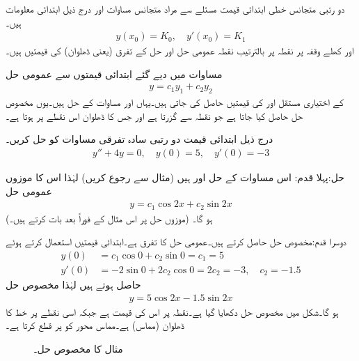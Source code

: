 دو رتبی متجانس خطی ابتدائی قیمت مسئلے سے مراد متجانس مساوات  اور درج ذیل ابتدائی معلومات ہیں۔
\begin{align}\label{مساوات_سادہ_دو_درجی_ابتدائی_قیمتیں}
y(x_0)=K_0,\quad y'(x_0)=K_1
\end{align}
 اور   کھلے وقفہ پر نقطہ  پر بالترتیب نقطہ عمومی حل اور حل کے تفرق (یعنی ڈھلوان) کی قیمتیں ہیں۔ 

مساوات  میں دیے گئے ابتدائی قیمتوں سے عمومی حل
\begin{align}
y=c_1y_1+c_2y_2
\end{align}
کے اختیاری مستقل  اور  کی قیمتیں حاصل کی جاتی ہیں۔یہاں  اور  مساوات  کے حل ہیں۔یوں مخصوص حل حاصل کیا جاتا ہے جو نقطہ  سے گزرتا ہے اور جس کا ڈھلوان اس نقطے پر  ہوتا ہے۔

درج ذیل ابتدائی قیمت دو رتبی سادہ تفرقی مساوات کو حل کریں۔
\begin{align*}
y''+4y=0,\quad y(0)=5,\quad y'(0)=-3
\end{align*}

حل:پہلا قدم: \quad اس مساوات کے حل   اور  ہیں (مثال  سے رجوع کریں) لہٰذا اس کا موزوں عمومی حل
\begin{align}\label{مساوات_سادہ_دو_درجی_عمومی_حل_الف}
y=c_1\cos 2x+c_2\sin 2x
\end{align}
ہو گا۔ (موزوں حل پر اس مثال کے فوراً بعد بات کرتے ہیں۔)

دوسرا قدم:مخصوص حل حاصل کرتے ہیں۔عمومی حل کا تفرق  ہے۔ابتدائی قیمتیں استعمال کرتے ہوئے
\begin{align*}
y(0)&=c_1 \cos 0+c_2\sin 0=c_1=5\\
y'(0)&=-2\sin 0+2c_2\cos 0=2c_2=-3, \quad c_2=-1.5
\end{align*}
حاصل ہوتے ہیں لہٰذا مخصوص حل
\begin{align*}
y=5\cos 2x-1.5\sin 2x
\end{align*}
ہو گا۔شکل  میں مخصوص حل دکھایا گیا ہے۔نقطہ  پر اس کی قیمت  ہے جبکہ اسی نقطے پر خط کا ڈھلوان (مماس)  ہے۔مماس محور  کو  پر قطع کرتا ہے۔
\begin{figure}
\centering
{}
\caption{مثال  کا مخصوص حل۔}
\label{شکل_مثال_سادہ_دو_درجی_ابتدائی_قیمت_الف}
\end{figure}

